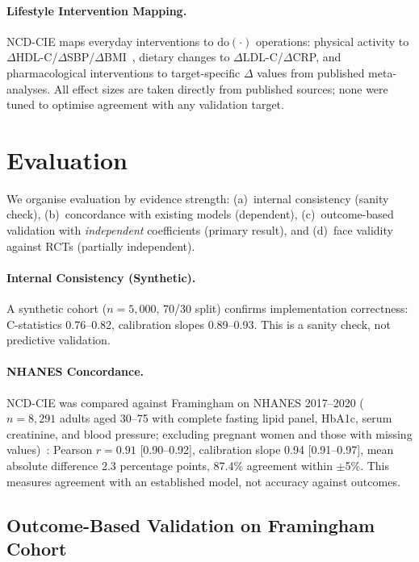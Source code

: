 \documentclass[runningheads]{llncs}
\begin{document}
\paragraph{Lifestyle Intervention Mapping.}
NCD-CIE maps everyday interventions to $\mathrm{do}(\cdot)$
operations: physical activity to $\Delta$HDL-C/$\Delta$SBP/$\Delta$BMI~\cite{naci2018comparative},
dietary changes to $\Delta$LDL-C/$\Delta$CRP, and
pharmacological interventions to target-specific $\Delta$ values
from published meta-analyses.
All effect sizes are taken directly from published sources;
none were tuned to optimise agreement with any validation target.

\section{Evaluation}\label{sec:validation}

We organise evaluation by evidence strength:
(a)~internal consistency (sanity check),
(b)~concordance with existing models (dependent),
(c)~outcome-based validation with \emph{independent} coefficients
(primary result), and
(d)~face validity against RCTs (partially independent).

\paragraph{Internal Consistency (Synthetic).}
A synthetic cohort ($n = 5{,}000$, 70/30 split) confirms
implementation correctness: C-statistics 0.76--0.82, calibration
slopes 0.89--0.93.
This is a sanity check, not predictive validation.

\paragraph{NHANES Concordance.}
NCD-CIE was compared against Framingham on NHANES 2017--2020
($n = 8{,}291$ adults aged 30--75 with complete fasting lipid panel,
HbA1c, serum creatinine, and blood pressure; excluding pregnant
women and those with missing values)~\cite{nhanes2020}:
Pearson $r = 0.91$ [0.90--0.92],
calibration slope 0.94 [0.91--0.97], mean absolute difference
2.3 percentage points, 87.4\% agreement within $\pm$5\%.
This measures agreement with an established model, not accuracy
against outcomes.

\subsection{Outcome-Based Validation on Framingham Cohort}\label{sec:framingham}
\end{document}
